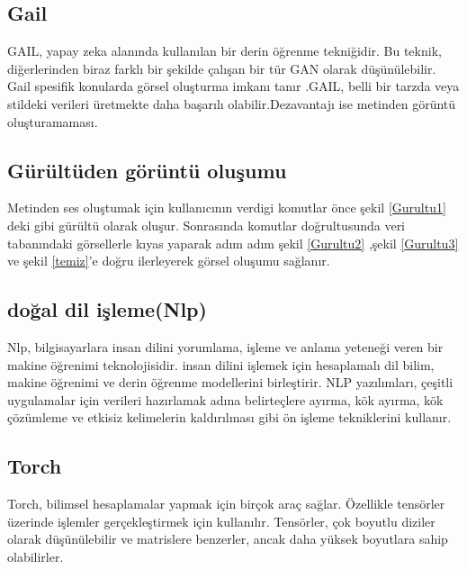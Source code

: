 \documentclass[12pt, a4paper]{article}
\begin{document}
	\subsection{Gail}
	GAIL,  yapay zeka alanında kullanılan bir derin öğrenme tekniğidir. Bu teknik, diğerlerinden biraz farklı bir şekilde çalışan bir tür GAN olarak düşünülebilir. Gail spesifik konularda görsel oluşturma imkanı tanır .GAIL, belli bir tarzda veya stildeki verileri üretmekte daha başarılı olabilir.Dezavantajı ise metinden görüntü oluşturamaması.\\
	
	\subsection{Gürültüden görüntü oluşumu}	
	
	Metinden ses oluştumak için kullanıcının verdigi komutlar önce şekil \ref{Gurultu1} deki gibi gürültü olarak oluşur. Sonrasında komutlar doğrultusunda veri tabanındaki görsellerle kıyas yaparak adım adım şekil \ref{Gurultu2} ,şekil \ref{Gurultu3} ve şekil \ref{temiz}'e doğru ilerleyerek görsel oluşumu sağlanır.				
	
	\subsection{doğal dil işleme(Nlp)}		
	Nlp, bilgisayarlara insan dilini yorumlama, işleme ve anlama yeteneği veren bir makine öğrenimi teknolojisidir. insan dilini işlemek için hesaplamalı dil bilim, makine öğrenimi ve derin öğrenme modellerini birleştirir. NLP yazılımları, çeşitli uygulamalar için verileri hazırlamak adına belirteçlere ayırma, kök ayırma, kök çözümleme ve etkisiz kelimelerin kaldırılması gibi ön işleme tekniklerini kullanır. 
	
	\subsection{Torch}
	Torch, bilimsel hesaplamalar yapmak için birçok araç sağlar. Özellikle tensörler üzerinde işlemler gerçekleştirmek için kullanılır. Tensörler, çok boyutlu diziler olarak düşünülebilir ve matrislere benzerler, ancak daha yüksek boyutlara sahip olabilirler.
	
\end{document}
